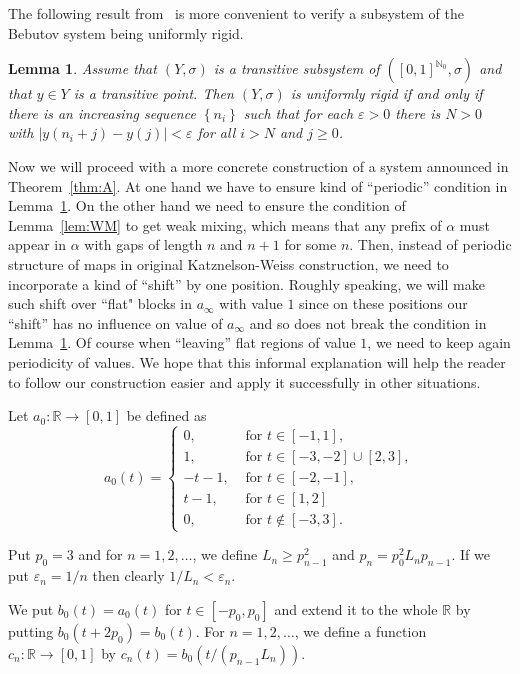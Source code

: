 \documentclass[reqno,a4paper,12pt]{amsart}
\newtheorem{lem}[thm]{Lemma}
\theoremstyle{definition}
\numberwithin{equation}{section}
\begin{document}
The following result from~
\cite[Lemma 2.1]{HYBeb} is more convenient
to verify a subsystem of the Bebutov system being uniformly rigid.
\begin{lem}\label{lem:urec}
Assume that $(Y,\sigma)$ is a transitive subsystem of $([0,1]^{{\mathbb{N}}_0},\sigma)$
and that $y\in Y$ is a transitive point.
Then $(Y,\sigma)$ is uniformly rigid if and only if there is an increasing sequence ${\left\{{n_i}\right\}}$
such that for each ${\varepsilon}>0$ there is $N>0$ with $|y(n_i+j)-y(j)|<{\varepsilon}$ for all $i>N$ and $j\geq 0$.
\end{lem}

Now we will proceed with a more concrete construction of a system announced in Theorem~\ref{thm:A}.
At one hand we have to ensure kind of ``periodic'' condition in Lemma~\ref{lem:urec}. On the other
hand we need to ensure the condition of Lemma~\ref{lem:WM} to get weak mixing, which means that any prefix of $\alpha$ must appear
in $\alpha$ with gaps of length $n$ and $n+1$ for some $n$. Then, instead of periodic structure of maps in original
Katznelson-Weiss construction, we need to incorporate a kind of ``shift'' by one position. Roughly speaking, we will make such shift
over ``flat" blocks in $a_\infty$ with value $1$ since on these positions our ``shift'' has no influence on value of $a_\infty$
and so does not break the condition in Lemma~\ref{lem:urec}. Of course when ``leaving'' flat regions of value $1$, we need to keep again periodicity of values.
We hope that this informal explanation will help the reader to follow our construction easier and apply it successfully in other situations.

Let $a_0\colon \mathbb{R}\to [0,1]$ be defined as
\[
a_0(t)=\begin{cases}
  0, & \text{ for } t\in [-1,1],\\
  1, & \text{ for } t\in [-3,-2]\cup [2,3],\\
  -t-1,&\text{ for } t\in[-2,-1],\\
  t-1,& \text{ for } t\in[1,2]\\
  0, & \text{ for }t\not \in [-3,3].
\end{cases}
\]

Put $p_0=3$ and for $n=1,2,\ldots$, we define $L_{n}\geq p_{n-1}^2$ and $p_n=p_0^2 L_n p_{n-1}$.
If we put ${\varepsilon}_n=1/n$ then clearly $1/L_n <{\varepsilon}_n$.

We put $b_0(t)=a_0(t)$ for $t\in [-p_0,p_0]$ and extend it to the whole ${\mathbb{R}}$ by
putting $b_0(t+2p_0)=b_0(t)$.
For $n=1,2,\ldots$, we define a function $c_n\colon {\mathbb{R}} \to [0,1]$ by
$c_n(t)=b_0(t/(p_{n-1}L_{n}))$.
\end{document}
